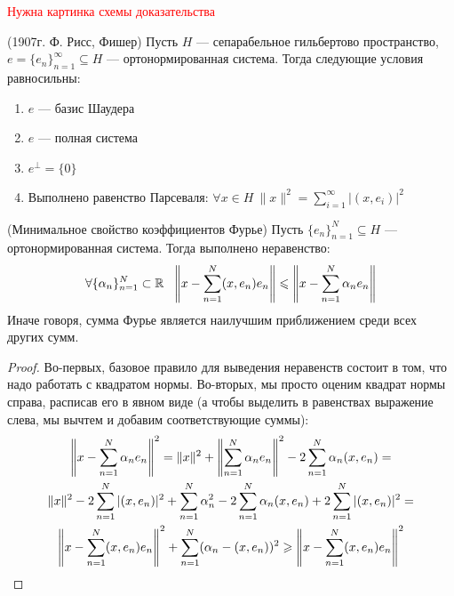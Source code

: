 \textcolor{red}{Нужна картинка схемы доказательства}

\begin{theorem} (1907г. Ф. Рисс, Фишер)
	Пусть $H$ --- сепарабельное гильбертово пространство, $e = \{e_n\}_{n = 1}^\infty \subseteq H$ --- ортонормированная система. Тогда следующие условия равносильны:
	\begin{enumerate}
		\item $e$ --- базис Шаудера
		
		\item $e$ --- полная система
		
		\item $e^\bot = \{0\}$
		
		\item Выполнено равенство Парсеваля: $\forall x \in H\ \|x\|^2 = \sum_{i = 1}^\infty |(x, e_i)|^2$
	\end{enumerate}
\end{theorem}

\begin{lemma} (Минимальное свойство коэффициентов Фурье)
	Пусть $\{e_n\}_{n = 1}^N \subseteq H$ --- ортонормированная система. Тогда выполнено неравенство:
	\[
	\forall \{\alpha_n\}_{n = 1}^N \subset \R\ \ \no{x - \sum_{n = 1}^N (x, e_n)e_n} \le \no{x - \sum_{n = 1}^N \alpha_n e_n}
	\]
	Иначе говоря, сумма Фурье является наилучшим приближением среди всех других сумм.
\end{lemma}

\begin{proof}
	Во-первых, базовое правило для выведения неравенств состоит в том, что надо работать с квадратом нормы. Во-вторых, мы просто оценим квадрат нормы справа, расписав его в явном виде (а чтобы выделить в равенствах выражение слева, мы вычтем и добавим соответствующие суммы):
	\begin{multline*}
	\left\|x - \sum_{n = 1}^N \alpha_n e_n\right\|^2 = \|x\|^2 + \left\|\sum_{n = 1}^N \alpha_n e_n\right\|^2 - 2\sum_{n = 1}^N \alpha_n (x, e_n) =
	\\
	\|x\|^2 - 2\sum_{n = 1}^N |(x, e_n)|^2 + \sum_{n = 1}^N \alpha_n^2 - 2\sum_{n = 1}^N \alpha_n(x, e_n) + 2\sum_{n = 1}^N |(x, e_n)|^2 =
	\\
	\left\|x - \sum_{n = 1}^N (x, e_n)e_n\right\|^2 + \sum_{n = 1}^N (\alpha_n - (x, e_n))^2 \geqslant \left\|x - \sum_{n = 1}^N (x, e_n)e_n\right\|^2
	\end{multline*}
\end{proof}

